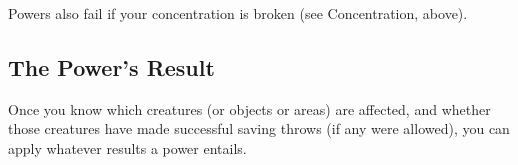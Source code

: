 Powers also fail if your concentration is broken (see Concentration, above).

\subsection{The Power's Result}
Once you know which creatures (or objects or areas) are affected, and whether those creatures have made successful saving throws (if any were allowed), you can apply whatever results a power entails.


